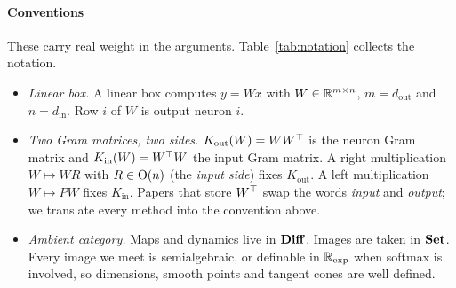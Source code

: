 \paragraph{Conventions}
These carry real weight in the arguments. Table~\ref{tab:notation} collects the notation.
\begin{itemize}
\item \emph{Linear box.} A linear box computes $y=Wx$ with $W\in\mathbb{R}^{m\times n}$, $m=d_{\mathrm{out}}$ and $n=d_{\mathrm{in}}$. Row $i$ of $W$ is output neuron $i$.
\item \emph{Two Gram matrices, two sides.} $K_{\mathrm{out}}(W)=WW^{\top}$ is the neuron Gram matrix and $K_{\mathrm{in}}(W)=W^{\top} W$ the input Gram matrix. A right multiplication $W\mapsto WR$ with $R\in\mathrm{O}(n)$ (the \emph{input side}) fixes $K_{\mathrm{out}}$. A left multiplication $W\mapsto PW$ fixes $K_{\mathrm{in}}$. Papers that store $W^{\top}$ swap the words \emph{input} and \emph{output}; we translate every method into the convention above.
\item \emph{Ambient category.} Maps and dynamics live in $\mathbf{Diff}$. Images are taken in $\mathbf{Set}$. Every image we meet is semialgebraic, or definable in $\mathbb{R}_{\exp}$ when softmax is involved, so dimensions, smooth points and tangent cones are well defined.
\end{itemize}

